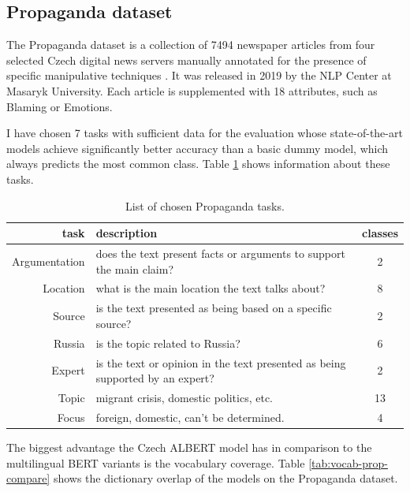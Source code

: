 \documentclass[
  printed, %
  color,   %
  table,   %
  oneside, %
  lof,     %
  lot,     %
]{fithesis3}
\begin{document}
\newpage
\subsection{Propaganda dataset}
The Propaganda dataset is a collection of 7494 newspaper articles from four selected Czech
digital news servers manually annotated for the presence of specific manipulative techniques \parencite{propaganda}. It was released in 2019  by the NLP Center at Masaryk University.
Each article is supplemented with 18 attributes, such as Blaming or Emotions.

I have chosen 7 tasks with sufficient data for the evaluation whose state-of-the-art models achieve significantly better accuracy than a basic dummy model, which always predicts the most common class. Table \ref{tab:prop-tasks} shows information about these tasks.

\begin{table}[hbt]
\small
\centering
\begin{tabularx}{\linewidth}{r|X|c}
        task & description & classes  \\
    \toprule
        Argumentation   & does the text present facts or arguments to support the main claim? 
            & 2 \\
        Location        &  what is the main location the text talks about?
            & 8  \\
        Source          & is the text presented as being based on a specific source?
            & 2  \\
        Russia          & is the topic related to Russia?
            & 6 \\
        Expert          &  is the text or opinion in the text presented as being supported by an expert?
            & 2  \\
        Topic           &  migrant crisis, domestic politics, etc.
            & 13  \\
        Focus           & foreign, domestic, can’t be determined.
            & 4  \\
        
\end{tabularx}
\caption[Chosen Propaganda tasks]
{List of chosen Propaganda tasks.}
\label{tab:prop-tasks}
\end{table} %

The biggest advantage the Czech ALBERT model has in comparison to the multilingual BERT variants is the vocabulary coverage. Table \ref{tab:vocab-prop-compare} shows the dictionary overlap of the models on the Propaganda dataset.
\end{document}
